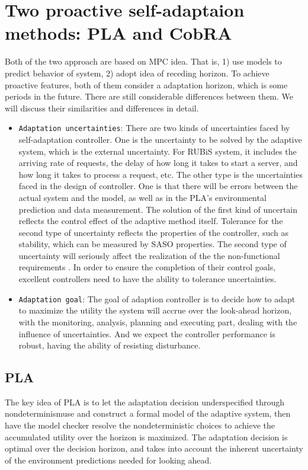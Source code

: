 \documentclass[sigconf]{acmart}
\begin{document}
\section{Two proactive self-adaptaion methods: PLA and CobRA}
Both of the two approach are based on MPC idea. That is, 1) use models to predict behavior of system, 2) adopt idea of receding horizon. To achieve proactive features, both of them consider a adaptation horizon, which is some periods in the future. There are still considerable differences between them. We will discuss their similarities and differences in detail.
\begin{itemize}
	\item {\verb|Adaptation uncertainties|}:
	There are two kinds of uncertainties faced by self-adaptation controller. One is the uncertainty to be solved by the adaptive system, which is the external uncertainty. For RUBiS system, it includes the arriving rate of requests, the delay of how long it takes to start a server, and how long it takes to process a request, etc. The other type is the uncertainties faced in the design of controller. One is that there will be errors between the actual system and the model, as well as in the PLA's environmental prediction and data measurement.
	The solution of the first kind of uncertain reflects the control effect of the adaptive method itself.
	Tolerance for the second type of uncertainty reflects the properties of the controller, such as stability, which can be measured by SASO properties\cite{saso}.
	The second type of uncertainty will seriously affect the realization of the the non-functional requirements . In order to ensure the completion of their control goals, excellent controllers need to have the ability to tolerance uncertainties.
	\item {\verb|Adaptation goal|}:
	The goal of adaption controller is to decide how to adapt to maximize the utility the system will accrue over the look-ahead horizon, with the monitoring, analysis, planning and executing part, dealing with the influence of uncertainties. And we expect the controller performance is robust, having the ability of resisting disturbance.
\end{itemize}
\subsection{PLA}
The key idea of PLA is to let the adaptation decision underspecified through nondeterminismuse and construct a formal model of the adaptive system, then have the model checker resolve the nondeterministic choices to achieve the accumulated utility over the horizon is maximized. The adaptation decision is optimal over the decision horizon, and takes into account the inherent uncertainty of the environment predictions needed for looking ahead.
\end{document}
